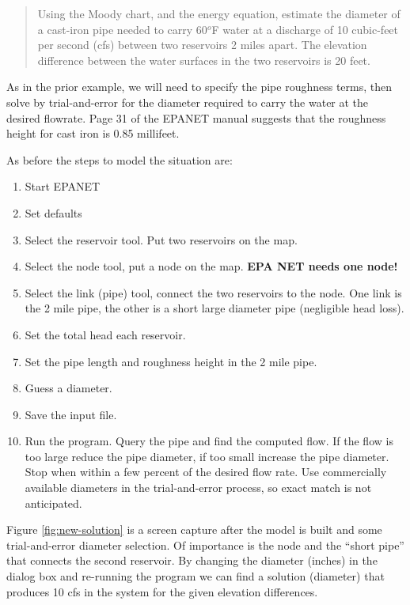 \begin{quote}
Using the Moody chart, and the energy equation, estimate the diameter of a cast-iron pipe needed to carry 60$^o$F water at a discharge of 10 cubic-feet per second (cfs) between two reservoirs 2 miles apart.  The elevation difference between the water surfaces in the two reservoirs is 20 feet.
\end{quote}

As in the prior example, we will need to specify the pipe roughness terms, then solve by trial-and-error for the diameter required to carry the water at the desired flowrate.  Page 31 of the EPANET manual suggests that the roughness height for cast iron is 0.85 millifeet.  

As before the steps to model the situation are:
\begin{enumerate}
\item Start EPANET
\item Set defaults
\item Select the reservoir tool.  Put two reservoirs on the map.
\item Select the node tool, put a node on the map. \textbf{EPA NET needs one node!}
\item Select the link (pipe) tool, connect the two reservoirs to the node.  One link is the 2 mile pipe, the other is a short large diameter pipe (negligible head loss).
\item Set the total head each reservoir.
\item Set the pipe length and roughness height in the 2 mile pipe.
\item Guess a diameter.
\item Save the input file.
\item Run the program.   Query the pipe and find the computed flow.  If the flow is too large reduce the pipe diameter, if too small increase the pipe diameter.  Stop when within a few percent of the desired flow rate.  Use commercially available diameters in the trial-and-error process, so exact match is not anticipated.
\end{enumerate}

Figure \ref{fig:new-solution} is a screen capture after the model is built and some trial-and-error diameter selection.   Of importance is the node and the ``short pipe'' that connects the second reservoir.   By changing the diameter (inches) in the dialog box and re-running the program we can find a solution (diameter) that produces 10 cfs in the system for the given elevation differences.  

